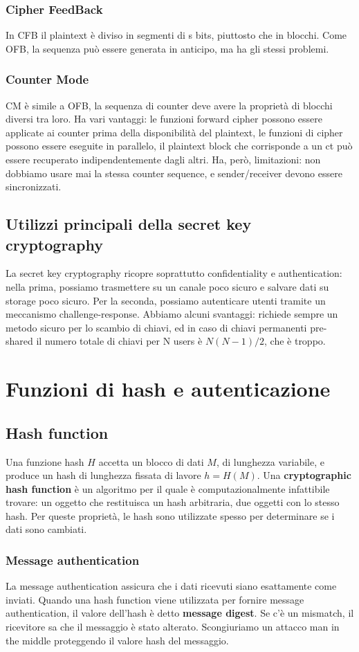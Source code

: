 \documentclass[11pt]{article}
\begin{document}
\subsubsection{Cipher FeedBack}
In CFB il plaintext è diviso in segmenti di s bits, piuttosto che in blocchi. Come OFB, la sequenza può essere generata in anticipo, ma ha gli stessi problemi. 
\subsubsection{Counter Mode}
CM è simile a OFB, la sequenza di counter deve avere la proprietà di blocchi diversi tra loro. Ha vari vantaggi: le funzioni forward cipher possono essere applicate ai counter prima della disponibilità del plaintext, le funzioni di cipher possono essere eseguite in parallelo, il plaintext block che corrisponde a un ct può essere recuperato indipendentemente dagli altri. Ha, però, limitazioni: non dobbiamo usare mai la stessa counter sequence, e sender/receiver devono essere sincronizzati.
\subsection{Utilizzi principali della secret key cryptography}
La secret key cryptography ricopre soprattutto confidentiality e authentication: nella prima, possiamo trasmettere su un canale poco sicuro e salvare dati su storage poco sicuro. Per la seconda, possiamo autenticare utenti tramite un meccanismo challenge-response.
Abbiamo alcuni svantaggi: richiede sempre un metodo sicuro per lo scambio di chiavi, ed in caso di chiavi permanenti pre-shared il numero totale di chiavi per N users è $N(N-1)/2$, che è troppo.

\section{Funzioni di hash e autenticazione}
\subsection{Hash function}
Una funzione hash $H$ accetta un blocco di dati $M$, di lunghezza variabile, e produce un hash di lunghezza fissata di lavore $h=H(M)$. Una \textbf{cryptographic hash function} è un algoritmo per il quale è computazionalmente infattibile trovare: un oggetto che restituisca un hash arbitraria, due oggetti con lo stesso hash. Per queste proprietà, le hash sono utilizzate spesso per determinare se i dati sono cambiati. 
\subsubsection{Message authentication}
La message authentication assicura che i dati ricevuti siano esattamente come inviati. Quando una hash function viene utilizzata per fornire message authentication, il valore dell'hash è detto \textbf{message digest}. Se c'è un mismatch, il ricevitore sa che il messaggio è stato alterato. 
Scongiuriamo un attacco man in the middle proteggendo il valore hash del messaggio.
\end{document}
